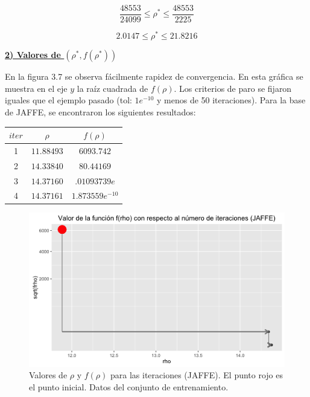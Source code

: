 \begin{equation*}
\frac{48553}{24099} \leq \rho^* \leq \frac{48553}{2225}
\end{equation*}

\begin{equation*}
2.0147 \leq \rho^* \leq 21.8216
\end{equation*}


\pagebreak
\underline{\textbf{2) Valores de $(\rho^*, f(\rho^*))$}}

En la figura 3.7 se observa fácilmente rapidez de convergencia. En esta gráfica se muestra en el eje $y$ la raíz cuadrada de $f(\rho)$. Los criterios de paro se fijaron iguales que el ejemplo pasado (tol: $1e^{-10}$ y menos de 50 iteraciones). Para la base de JAFFE, se encontraron los siguientes resultados:

\begin{center}
\begin{tabular}{ | c | c|  c |} 
\hline
$iter$ & $\rho$ & $f(\rho)$  \\ 
\hline
\hline
1 & $11.88493$ & $6093.742$  \\ 
\hline
2 & $14.33840$ & $80.44169$  \\ 
\hline
3 & $14.37160$ & $.01093739e$  \\ 
\hline
4 & $14.37161$ & $1.873559 e^{-10}$  \\ 
\hline
\hline
\end{tabular}
\end{center}

\begin{figure}[!ht]
  \centering
  \includegraphics[width=.75 \textwidth]{Figures/Chapter4_Iteraciones_JAF.png} 
  \caption[Valores de $\rho$ y $f(\rho)$ para las iteraciones (JAFFE).]
  {Valores de $\rho$ y $f(\rho)$ para las iteraciones (JAFFE). El punto rojo es el punto inicial. Datos del conjunto de entrenamiento.}
\end{figure}

